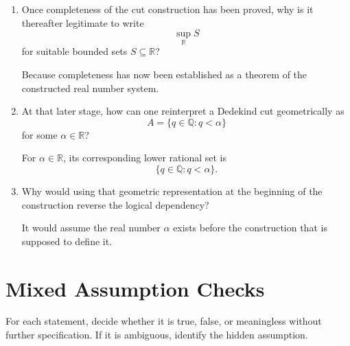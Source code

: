 \documentclass{self-check}
\begin{document}
\begin{enumerate}[label=\arabic{*}., itemsep=10pt]
    \begin{answer}
      The first is an existence axiom or theorem. The second provides a concrete object and proves that it has the required property.
    \end{answer}
  \item Once completeness of the cut construction has been proved, why is it thereafter legitimate to write
    \[ \sup_{\mathbb{R}}S \]
    for suitable bounded sets \(S\subseteq\mathbb{R}\)?

    \begin{answer}
      Because completeness has now been established as a theorem of the constructed real number system.
    \end{answer}
  \item At that later stage, how can one reinterpret a Dedekind cut geometrically as
    \[ A=\{q\in\mathbb{Q}:q<\alpha\} \]
    for some \(\alpha\in\mathbb{R}\)?

    \begin{answer}
      For \(\alpha\in\mathbb{R}\), its corresponding lower rational set is
      \[ \{q\in\mathbb{Q}:q<\alpha\}. \]
    \end{answer}
  \item Why would using that geometric representation at the beginning of the construction reverse the logical dependency?

    \begin{answer}
      It would assume the real number \(\alpha\) exists before the construction that is supposed to define it.
    \end{answer}
\end{enumerate}

\section{Mixed Assumption Checks}

For each statement, decide whether it is true, false, or meaningless without further specification. If it is ambiguous, identify the hidden assumption.
\end{document}
